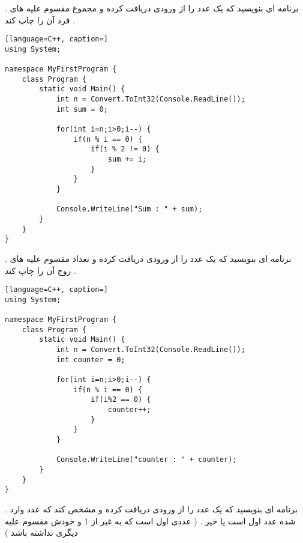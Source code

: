\documentclass[12pt]{article}
\begin{document}
\newpage


 . برنامه ای بنویسید که یک عدد را از ورودی دریافت کرده و مجموع مقسوم علیه های فرد آن را چاپ کند .





\begin{latin}
\begin{lstlisting}[language=C++, caption=]
using System;

namespace MyFirstProgram {
	class Program {
		static void Main() {
			int n = Convert.ToInt32(Console.ReadLine());
			int sum = 0;
			
			for(int i=n;i>0;i--) {
				if(n % i == 0) {
					if(i % 2 != 0) {
						sum += i;
					}
				}
			}
			
			Console.WriteLine("Sum : " + sum);
		}
	}
}
\end{lstlisting}
\end{latin}








\newpage

 . برنامه ای بنویسید که یک عدد را از ورودی دریافت کرده و تعداد مقسوم علیه های زوج آن را چاپ کند .






\begin{latin}
\begin{lstlisting}[language=C++, caption=]
using System;

namespace MyFirstProgram {
	class Program {
		static void Main() {
			int n = Convert.ToInt32(Console.ReadLine());
			int counter = 0;
			
			for(int i=n;i>0;i--) {
				if(n % i == 0) {
					if(i%2 == 0) {
						counter++;
					}
				}
			}
			
			Console.WriteLine("counter : " + counter);
		}
	}
}
\end{lstlisting}
\end{latin}







\newpage

 . برنامه ای بنویسید که یک عدد را از ورودی دریافت کرده و مشخص کند که عدد وارد شده عدد اول است یا خیر . ( عددی اول است که به غیر از 1 و خودش مقسوم علیه دیگری نداشته باشد ) 
\end{document}
